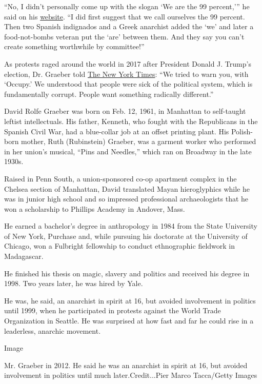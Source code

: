``No, I didn't personally come up with the slogan `We are the 99
percent,''' he said on his
\href{https://davidgraeber.industries/contact}{website}. ``I did first
suggest that we call ourselves the 99 percent. Then two Spanish
indignados and a Greek anarchist added the `we' and later a
food-not-bombs veteran put the `are' between them. And they say you
can't create something worthwhile by committee!''

As protests raged around the world in 2017 after President Donald J.
Trump's election, Dr. Graeber told
\href{https://www.nytimes3xbfgragh.onion/2017/02/02/us/anarchists-respond-to-trumps-inauguration-by-any-means-necessary.html}{The
New York Times}: ``We tried to warn you, with `Occupy.' We understood
that people were sick of the political system, which is fundamentally
corrupt. People want something radically different.''

David Rolfe Graeber was born on Feb. 12, 1961, in Manhattan to
self-taught leftist intellectuals. His father, Kenneth, who fought with
the Republicans in the Spanish Civil War, had a blue-collar job at an
offset printing plant. His Polish-born mother, Ruth (Rubinstein)
Graeber, was a garment worker who performed in her union's musical,
``Pins and Needles,'' which ran on Broadway in the late 1930s.

Raised in Penn South, a union-sponsored co-op apartment complex in the
Chelsea section of Manhattan, David translated Mayan hieroglyphics while
he was in junior high school and so impressed professional
archaeologists that he won a scholarship to Phillips Academy in Andover,
Mass.

He earned a bachelor's degree in anthropology in 1984 from the State
University of New York, Purchase and, while pursuing his doctorate at
the University of Chicago, won a Fulbright fellowship to conduct
ethnographic fieldwork in Madagascar.

He finished his thesis on magic, slavery and politics and received his
degree in 1998. Two years later, he was hired by Yale.

He was, he said, an anarchist in spirit at 16, but avoided involvement
in politics until 1999, when he participated in protests against the
World Trade Organization in Seattle. He was surprised at how fast and
far he could rise in a leaderless, anarchic movement.

Image

Mr. Graeber in 2012. He said he was an anarchist in spirit at 16, but
avoided involvement in politics until much later.Credit...Pier Marco
Tacca/Getty Images

